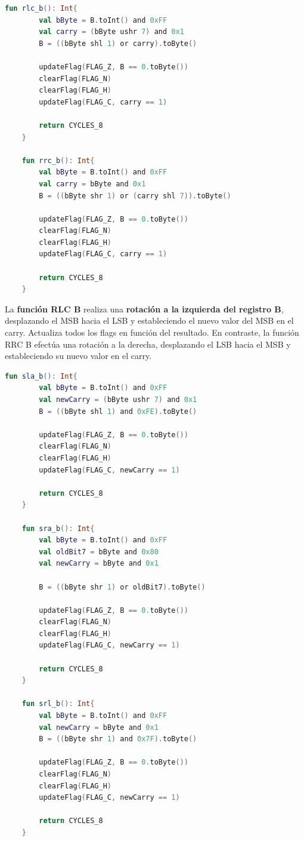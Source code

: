 \begin{lstlisting}[language=Kotlin, caption={Operaciones RLC y RRC}, label={code:kotlinrlcrrc}]
    fun rlc_b(): Int{
        val bByte = B.toInt() and 0xFF
        val carry = (bByte ushr 7) and 0x1
        B = ((bByte shl 1) or carry).toByte()

        updateFlag(FLAG_Z, B == 0.toByte())
        clearFlag(FLAG_N)
        clearFlag(FLAG_H)
        updateFlag(FLAG_C, carry == 1)

        return CYCLES_8
    }

    fun rrc_b(): Int{
        val bByte = B.toInt() and 0xFF
        val carry = bByte and 0x1
        B = ((bByte shr 1) or (carry shl 7)).toByte()

        updateFlag(FLAG_Z, B == 0.toByte())
        clearFlag(FLAG_N)
        clearFlag(FLAG_H)
        updateFlag(FLAG_C, carry == 1)

        return CYCLES_8
    }
\end{lstlisting}

La \textbf{función RLC B} realiza una \textbf{rotación a la izquierda del registro B}, desplazando el MSB hacia el LSB y estableciendo el nuevo valor del MSB en el carry. Actualiza todos los flags en función del resultado. En contraste, la función RRC B efectúa una rotación a la derecha, desplazando el LSB hacia el MSB y estableciendo su nuevo valor en el carry.

\begin{lstlisting}[language=Kotlin, caption={Operaciones SLA, SRA y SRL}, label={code:kotlinslasrasrl}]
    fun sla_b(): Int{
        val bByte = B.toInt() and 0xFF
        val newCarry = (bByte ushr 7) and 0x1
        B = ((bByte shl 1) and 0xFE).toByte()

        updateFlag(FLAG_Z, B == 0.toByte())
        clearFlag(FLAG_N)
        clearFlag(FLAG_H)
        updateFlag(FLAG_C, newCarry == 1)
        
        return CYCLES_8
    }

    fun sra_b(): Int{
        val bByte = B.toInt() and 0xFF
        val oldBit7 = bByte and 0x80
        val newCarry = bByte and 0x1

        B = ((bByte shr 1) or oldBit7).toByte()

        updateFlag(FLAG_Z, B == 0.toByte())
        clearFlag(FLAG_N)
        clearFlag(FLAG_H)
        updateFlag(FLAG_C, newCarry == 1)

        return CYCLES_8
    }

    fun srl_b(): Int{
        val bByte = B.toInt() and 0xFF
        val newCarry = bByte and 0x1
        B = ((bByte shr 1) and 0x7F).toByte()

        updateFlag(FLAG_Z, B == 0.toByte())
        clearFlag(FLAG_N)
        clearFlag(FLAG_H)
        updateFlag(FLAG_C, newCarry == 1)

        return CYCLES_8
    }
\end{lstlisting}

